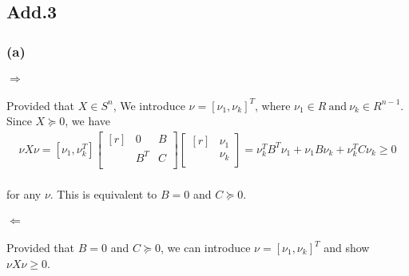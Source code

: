 \subsection*{Add.3}
\subsubsection*{(a)}
\paragraph{}
$\Rightarrow$
\paragraph{}
Provided that $X \in S^n$, We introduce $\nu = [\nu_1, \nu_k]^T$, where $\nu_1 \in R\ \text{and}\ \nu_k \in R^{n-1}$. Since $X \succeq 0$, we have
\begin{align*}
\nu X\nu =[\nu_1, \nu_k^T]\begin{bmatrix*}[r]
& 0 & B\\&B^T &C\\
\end{bmatrix*}\begin{bmatrix*}[r]
&\nu_1 \\&\nu_k\\ 
\end{bmatrix*}= \nu_k^TB^T\nu_1 + \nu_1B\nu_k +\nu_k^TC\nu_k \geq 0
\end{align*}
\paragraph{}
for any $\nu$. This is equivalent to $B =0$ and $C \succeq 0$.
\paragraph{}
$\Leftarrow$
\paragraph{}
Provided that $B =0$ and $C \succeq 0$, we can introduce $\nu = [\nu_1, \nu_k]^T$ and show $\nu X\nu \geq 0$.
